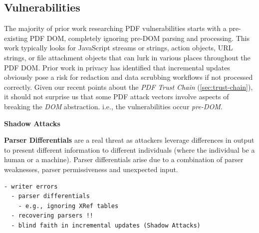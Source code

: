 
\subsection{Vulnerabilities }
\label{sec:vulnerabilities}


The majority of prior work researching PDF vulnerabilities starts with a pre-existing PDF DOM,
completely ignoring pre-DOM parsing and processing. This work typically looks for
JavaScript streams or strings, action objects, URL strings, or file attachment objects that 
can lurk in various places throughout the PDF DOM. Prior work in privacy has identified that
incremental updates obviously pose a risk for redaction and data scrubbing workflows if not processed correctly.
Given our recent points about the \emph{PDF Trust Chain} (\cref{sec:trust-chain}), it should not surprise us that some PDF attack vectors involve aspects of breaking the \emph{DOM} abstraction.
i.e., the vulnerabilities occur \emph{pre-DOM}.

{\bf{Shadow Attacks}} 

{\bf{Parser Differentials}} are a real threat as attackers leverage differences in output
to present different information to different individuals (where the individual be a human
or a machine). Parser differentials arise due to a combination of parser weaknesses, 
parser permissiveness and unexpected input.
\begin{lstlisting}[style=meta]
  - writer errors
  - parser differentials
    - e.g., ignoring XRef tables
  - recovering parsers !!
  - blind faith in incremental updates (Shadow Attacks)
\end{lstlisting}

